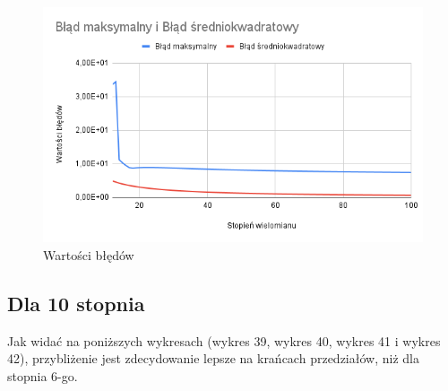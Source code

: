 \documentclass{article}
\begin{document}
\begin{figure}[H]
  \centering
  \begin{minipage}[b]{0.4\textwidth}
    \includegraphics[width=\textwidth]{img38.png}
    \caption{Wartości błędów}
  \end{minipage}
\end{figure}

\newpage

\subsection{Dla 10 stopnia}

\noindent
Jak widać na poniższych wykresach (wykres 39, wykres 40, wykres 41 i wykres 42), przybliżenie jest zdecydowanie lepsze na krańcach przedziałów, niż dla stopnia 6-go.
\end{document}
